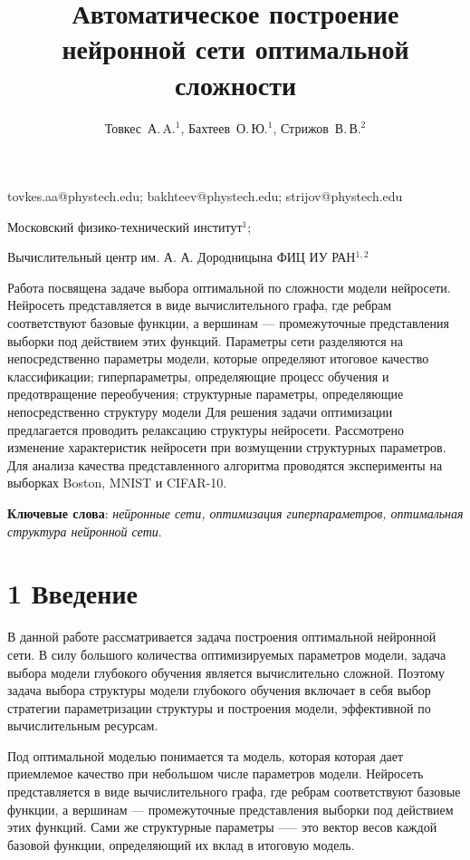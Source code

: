 \documentclass[12pt,twoside]{article}
\begin{document}
\title
    {Автоматическое построение нейронной сети оптимальной сложности}
\author
    {Товкес~А.\,A.$^1$, Бахтеев~О.\,Ю.$^1$, Стрижов~В.\,В.$^2$} %
\email
    {tovkes.aa@phystech.edu;  bakhteev@phystech.edu;  strijov@phystech.edu}
\organization
    {Московский физико-технический институт$^1$;
    	
    Вычислительный центр им. А. А. Дородницына ФИЦ ИУ РАН$^{1, 2}$}
\abstract
	{Работа посвящена задаче выбора оптимальной по сложности модели нейросети. Нейросеть представляется в виде вычислительного графа, где ребрам соответствуют базовые функции, а вершинам --- промежуточные представления выборки под действием этих функций. Параметры сети разделяются на непосредственно параметры модели, которые определяют итоговое качество классификации; гиперпараметры, определяющие процесс обучения и предотвращение переобучения; структурные параметры, определяющие непосредственно структуру модели 
    Для решения задачи оптимизации предлагается проводить релаксацию структуры нейросети. Рассмотрено изменение характеристик нейросети при возмущении структурных параметров. Для анализа качества представленного алгоритма проводятся эксперименты на выборках Boston, MNIST и CIFAR-10.

	

\bigskip
\textbf{Ключевые слова}: \emph {нейронные сети, оптимизация гиперпараметров, оптимальная структура нейронной сети}.

}
\maketitle

\section{1 Введение}
В данной работе рассматривается задача построения оптимальной нейронной сети. В силу большого количества оптимизируемых параметров модели, задача выбора модели глубокого обучения является вычислительно сложной. Поэтому задача выбора структуры модели глубокого обучения включает в себя выбор стратегии параметризации структуры и построения модели, эффективной по вычислительным ресурсам.

Под оптимальной моделью понимается та модель, которая которая дает приемлемое качество при небольшом числе параметров модели. Нейросеть представляется в виде вычислительного графа, где ребрам соответствуют базовые функции, а вершинам --- промежуточные представления выборки под действием этих функций. Сами же структурные параметры —-- это вектор весов каждой базовой функции, определяющий их вклад в итоговую модель.
\end{document}
